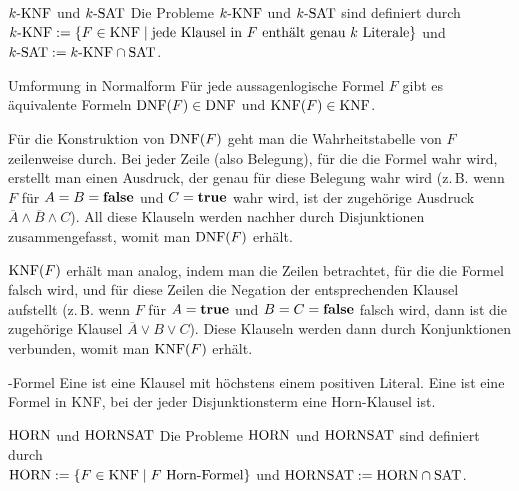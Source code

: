\begin{Def}{$k\text{-KNF}$ und $k\text{-SAT}$}
    Die Probleme $k\text{-KNF}$ und $k\text{-SAT}$ sind definiert durch\\
    $k\text{-KNF} := \{F \in \text{KNF} \;|\;
    \text{jede Klausel in } F \text{ enthält genau } k \text{ Literale}\}$ und\\
    $k\text{-SAT} := k\text{-KNF} \cap \text{SAT}$.
\end{Def}

\linie

\begin{Satz}{Umformung in Normalform}
    Für jede aussagenlogische Formel $F$ gibt es äquivalente
    Formeln $\text{DNF}(F) \in \text{DNF}$ und $\text{KNF}(F) \in \text{KNF}$.
\end{Satz}

\begin{Beweis}
    Für die Konstruktion von $\text{DNF}(F)$ geht man die Wahrheitstabelle von $F$
    zeilenweise durch.
    Bei jeder Zeile (also Belegung), für die die Formel wahr wird,
    erstellt man einen Ausdruck, der genau für diese Belegung wahr wird
    (z.\,B. wenn $F$ für $A = B = \mathbf{false}$ und $C = \mathbf{true}$ wahr wird,
    ist der zugehörige Ausdruck $\overline{A} \land \overline{B} \land C$).
    All diese Klauseln werden nachher durch Disjunktionen
    zusammengefasst, womit man $\text{DNF}(F)$ erhält.

    $\text{KNF}(F)$ erhält man analog, indem man die Zeilen betrachtet, für die die Formel falsch wird,
    und für diese Zeilen die Negation der entsprechenden Klausel aufstellt
    (z.\,B. wenn $F$ für $A = \mathbf{true}$ und $B = C = \mathbf{false}$ falsch wird,
    dann ist die zugehörige Klausel $\overline{A} \lor B \lor C$).
    Diese Klauseln werden dann durch Konjunktionen verbunden, womit man $\text{KNF}(F)$ erhält.
\end{Beweis}

\linie

\begin{Def}{-Formel}
    Eine  ist eine Klausel mit höchstens einem
    positiven Literal.
    Eine  ist eine Formel in KNF, bei der jeder
    Disjunktionsterm eine Horn-Klausel ist.
\end{Def}

\begin{Def}{$\text{HORN}$ und $\text{HORNSAT}$}
    Die Probleme $\text{HORN}$ und $\text{HORNSAT}$ sind definiert durch\\
    $\text{HORN} := \{F \in \text{KNF} \;|\;
    F \text{ Horn-Formel}\}$ und
    $\text{HORNSAT} := \text{HORN} \cap \text{SAT}$.
\end{Def}

